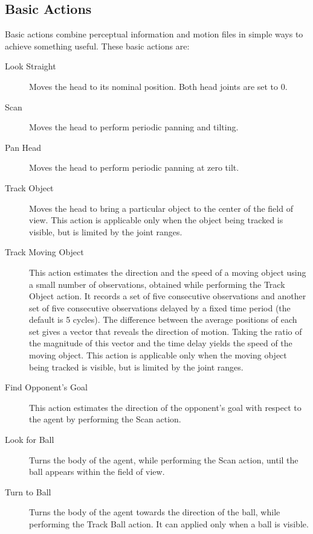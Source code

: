 \subsection{Basic Actions}
Basic actions combine perceptual information and motion files in simple ways to achieve something useful. These basic actions are:
\begin{description}
 
 \item[Look Straight] Moves the head to its nominal position. Both head joints are set to $0$.
 
 \item[Scan] Moves the head to perform periodic panning and tilting. 
 
 \item[Pan Head] Moves the head to perform periodic panning at zero tilt.
 
 \item[Track Object] Moves the head to bring a particular object to the center of the field of view. This action is applicable only when the object being tracked is visible, but is limited by the joint ranges. 
 
 \item[Track Moving Object] This action estimates the direction and the speed of a moving object using a small number of observations, obtained while performing the Track Object action. It records a set of five consecutive observations and another set of five consecutive observations delayed by a fixed time period (the default is 5 cycles).  The difference between the average positions of each set gives a vector that reveals the direction of motion. Taking the ratio of the magnitude of this vector and the time delay yields the speed of the moving object. This action is applicable only when the moving object being tracked is visible, but is limited by the joint ranges.
 
 \item[Find Opponent's Goal] This action estimates the direction of the opponent's goal with respect to the agent by performing the Scan action.
 
 \item[Look for Ball] Turns the body of the agent, while performing the Scan action, until the ball appears within the field of view.
 
 \item[Turn to Ball] Turns the body of the agent towards the direction of the ball, while performing the Track Ball action. It can applied only when a ball is visible.
 

\end{description}
